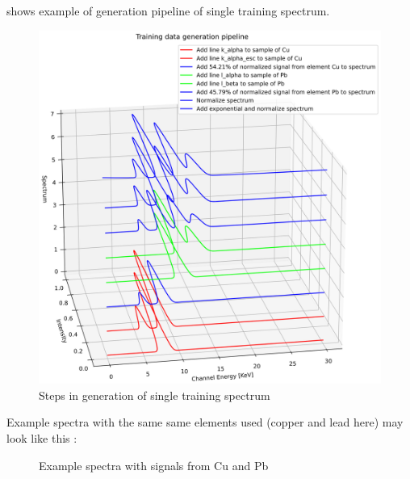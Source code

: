  shows example of generation pipeline of single training spectrum. 
\begin{figure}[H] 
  \centering     
  \includegraphics[width=1\textwidth]{img/training_data_generation_pipeline.png} 
  \caption{Steps in generation of single training spectrum}
  \label{fig:training_data_generation}
\end{figure}

Example spectra with the same same elements used (copper and lead here) may look like this :

\begin{figure}[H] 
  \centering     
   
  \caption{Example spectra with signals from Cu and Pb}
  \label{fig:sum-spectras}
\end{figure}


